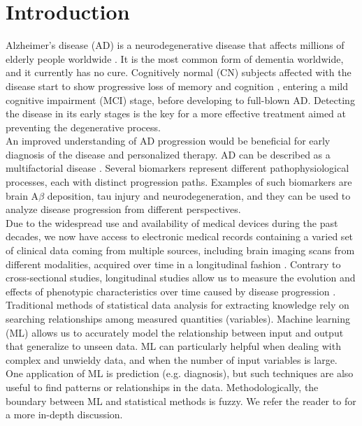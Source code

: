 \section{Introduction}

Alzheimer's disease (AD) is a neurodegenerative disease that affects millions of elderly people worldwide \cite{Ferri2005,Prince2013}. It is the most common form of dementia worldwide, and it currently has no cure. Cognitively normal (CN) subjects affected with the disease start to show progressive loss of memory and cognition \cite{Backman2004}, entering a mild cognitive impairment (MCI) stage, before developing to full-blown AD. Detecting the disease in its early stages is the key for a more effective treatment aimed at preventing the degenerative process.  \\

An improved understanding of AD progression would be beneficial for early diagnosis of the disease and personalized therapy. AD can be described as a multifactorial disease \cite{Jack2010}. Several biomarkers represent different pathophysiological processes, each with distinct progression paths. Examples of such biomarkers are brain A$\beta$ deposition, tau injury and neurodegeneration, and they can be used to analyze disease progression from different perspectives. \\ 

Due to the widespread use and availability of medical devices during the past decades, we now have access to electronic medical records containing a varied set of clinical data coming from multiple sources, including brain imaging scans from different modalities, acquired over time in a longitudinal fashion \cite{Lawrence2017}.  Contrary to cross-sectional studies, longitudinal studies allow us to measure the evolution and effects of phenotypic characteristics over time caused by disease progression \cite{Mills2014}. \\

Traditional methods of statistical data analysis for extracting knowledge rely on searching relationships among measured quantities (variables). Machine learning (ML) allows us to accurately model the relationship between input and output that generalize to unseen data. ML can particularly helpful when dealing with complex and unwieldy data, and when the number of input variables is large. One application of ML is prediction (e.g. diagnosis), but such techniques are also useful to find patterns or relationships in the data. Methodologically, the boundary between ML and statistical methods is fuzzy. We refer the reader to \cite{Breiman2001,Shmueli2010} for a more in-depth discussion. \\

